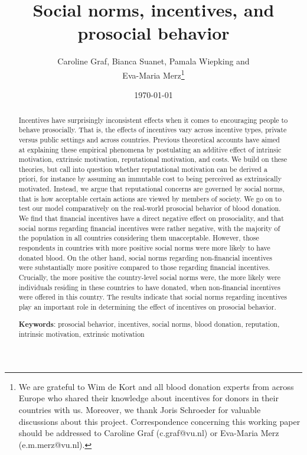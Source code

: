 \documentclass[AER]{AEA}
\begin{document}
\title{Social norms, incentives, and prosocial behavior}
\author{Caroline Graf, Bianca Suanet, Pamala Wiepking and\\ Eva-Maria Merz\thanks{We are grateful to Wim de Kort and all blood donation experts from across Europe who shared their knowledge about incentives for donors in their countries with us. Moreover, we thank Joris Schroeder for valuable discussions about this project. Correspondence concerning this working paper should be addressed to Caroline Graf (c.graf@vu.nl) or Eva-Maria Merz (e.m.merz@vu.nl).}}
\date{\today}
\pubVolume{}
\pubIssue{}
\JEL{}


\begin{abstract}
Incentives have surprisingly inconsistent effects when it comes to encouraging people to behave prosocially. That is, the effects of incentives vary across incentive types, private versus public settings and across countries. Previous theoretical accounts have aimed at explaining these empirical phenomena by postulating an additive effect of intrinsic motivation, extrinsic motivation, reputational motivation, and costs. We build on these theories, but call into question whether reputational motivation can be derived a priori, for instance by assuming an immutable cost to being perceived as extrinsically motivated. Instead, we argue that reputational concerns are governed by social norms, that is how acceptable certain actions are viewed by members of society. We go on to test our model comparatively on the real-world prosocial behavior of blood donation. We find that financial incentives have a direct negative effect on prosociality, and that social norms regarding financial incentives were rather negative, with the majority of the population in all countries considering them unacceptable. However, those respondents in countries with more positive social norms were more likely to have donated blood. On the other hand, social norms regarding non-financial incentives were substantially more positive compared to those regarding financial incentives. Crucially, the more positive the country-level social norms were, the more likely were individuals residing in these countries to have donated, when non-financial incentives were offered in this country. The results indicate that social norms regarding incentives play an important role in determining the effect of incentives on prosocial behavior.

\textbf{Keywords}: {\normalfont prosocial behavior, incentives, social norms, blood donation, reputation, intrinsic motivation, extrinsic motivation}
\end{abstract}
\end{document}
